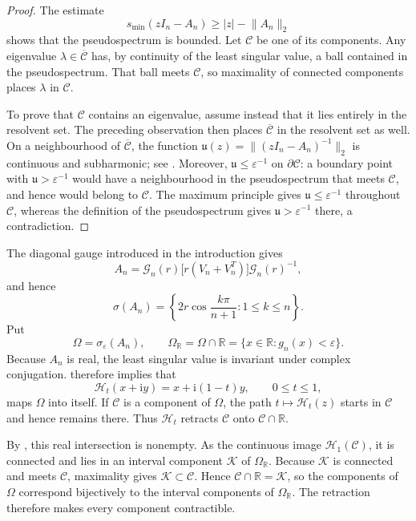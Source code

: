 \documentclass[12pt,anonymous]{iopjournal}
\numberwithin{equation}{section}
\theoremstyle{remark}
\newcommand{\R}{\mathbb R}
\newcommand{\ii}{\mathrm i}
\begin{document}
\begin{proof}
The estimate
\[
 s_{\min}(zI_n-A_n)\geq |z|-\lVert A_n\rVert_2
\]
shows that the pseudospectrum is bounded.  Let \(\mathcal C\) be one of its
components.  Any eigenvalue
\(\lambda\in\overline{\mathcal C}\) has, by continuity of the least singular
value, a ball contained in the pseudospectrum.  That ball meets
\(\mathcal C\), so maximality of connected components places \(\lambda\) in
\(\mathcal C\).

To prove that \(\mathcal C\) contains an eigenvalue, assume instead that it
lies entirely in the resolvent set.  The preceding observation then places
\(\overline{\mathcal C}\) in the resolvent set as well.  On a neighbourhood
of \(\overline{\mathcal C}\), the function
\(\mathfrak u(z)=\lVert(zI_n-A_n)^{-1}\rVert_2\) is continuous and
subharmonic; see
\cite{TrefethenEmbree2005}.  Moreover,
\(\mathfrak u\leq\varepsilon^{-1}\) on \(\partial\mathcal C\): a boundary
point with \(\mathfrak u>\varepsilon^{-1}\) would have a neighbourhood in
the pseudospectrum that meets \(\mathcal C\), and hence would belong to
\(\mathcal C\).  The maximum principle gives
\(\mathfrak u\leq\varepsilon^{-1}\) throughout \(\mathcal C\), whereas the
definition of the pseudospectrum gives
\(\mathfrak u>\varepsilon^{-1}\) there, a contradiction.
\end{proof}

The diagonal gauge introduced in the introduction gives
\[
 A_n=\mathcal G_n(r)\bigl[r(V_n+V_n^T)\bigr]
 \mathcal G_n(r)^{-1},
\]
and hence
\begin{equation}\label{eq:spectrum}
 \sigma(A_n)=\left\{2r\cos\frac{k\pi}{n+1}:1\leq k\leq n\right\}.
\end{equation}
Put
\[
 \Omega=\sigma_\varepsilon(A_n),\qquad
 \Omega_\R=\Omega\cap\R=\{x\in\R:g_n(x)<\varepsilon\}.
\]
Because \(A_n\) is real, the least singular value is invariant under
complex conjugation.   therefore implies that
\[
 \mathcal H_t(x+\ii y)=x+\ii(1-t)y,\qquad0\leq t\leq1,
\]
maps \(\Omega\) into itself.  If \(\mathcal C\) is a component of
\(\Omega\), the path \(t\mapsto\mathcal H_t(z)\) starts in
\(\mathcal C\) and hence remains there.  Thus \(\mathcal H_t\) retracts
\(\mathcal C\) onto
\(\mathcal C\cap\R\).

By , this real intersection is nonempty.  As the
continuous image \(\mathcal H_1(\mathcal C)\), it is connected and lies in
an interval component \(\mathcal K\) of \(\Omega_\R\).  Because
\(\mathcal K\) is connected and meets \(\mathcal C\), maximality gives
\(\mathcal K\subset\mathcal C\).  Hence
\(\mathcal C\cap\R=\mathcal K\), so the components of \(\Omega\) correspond
bijectively to the interval components of \(\Omega_\R\).  The retraction
therefore makes every component contractible.
\end{document}
